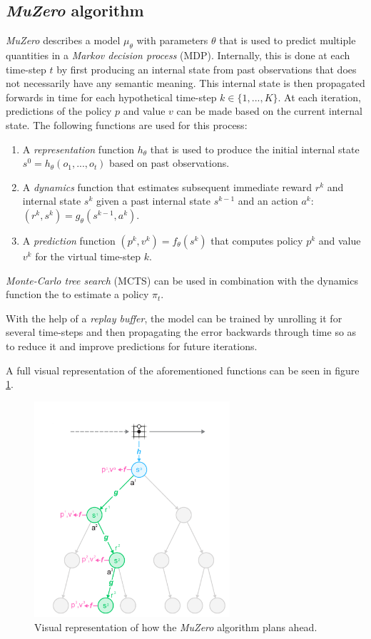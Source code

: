 \documentclass{article}
\begin{document}
\subsection{\textit{MuZero} algorithm}
\textit{MuZero} \cite{muzero} describes a model $\mu_\theta$ with parameters $\theta$ that is used to predict multiple quantities in a \textit{Markov decision process} (MDP). Internally, this is done at each time-step $t$ by first producing an internal state from past observations that does not necessarily have any semantic meaning. This internal state is then propagated forwards in time for each hypothetical time-step $k \in \{1, ..., K\}$. At each iteration, predictions of the policy $p$ and value $v$ can be made based on the current internal state. The following functions are used for this process:
\begin{enumerate}
    \item A \textit{representation} function $h_\theta$ that is used to produce the initial internal state $s^0 = h_{\theta}(o_1, ..., o_t)$ based on past observations.
    \item A \textit{dynamics} function that estimates subsequent immediate reward $r^k$ and internal state $s^k$ given a past internal state $s^{k-1}$ and an action $a^k$: \\ $(r^k, s^k) = g_\theta(s^{k-1}, a^k)$.
    \item A \textit{prediction} function $(p^k, v^k) = f_\theta(s^k)$ that computes policy $p^k$ and value $v^k$ for the virtual time-step $k$.
\end{enumerate}
\textit{Monte-Carlo tree search} (MCTS) can be used in combination with the dynamics function the to estimate a policy $\pi_t$.

With the help of a \textit{replay buffer}, the model can be trained by unrolling it for several time-steps and then propagating the error backwards through time so as to reduce it and improve predictions for future iterations.

A full visual representation of the aforementioned functions can be seen in figure \ref{fig:muzero}.

\begin{figure}[H]
    \centering
    \includegraphics[height=8cm]{muzero}
    \caption{Visual representation of how the \textit{MuZero} algorithm plans ahead. \cite{muzero}}
    \label{fig:muzero}
\end{figure}
\end{document}
